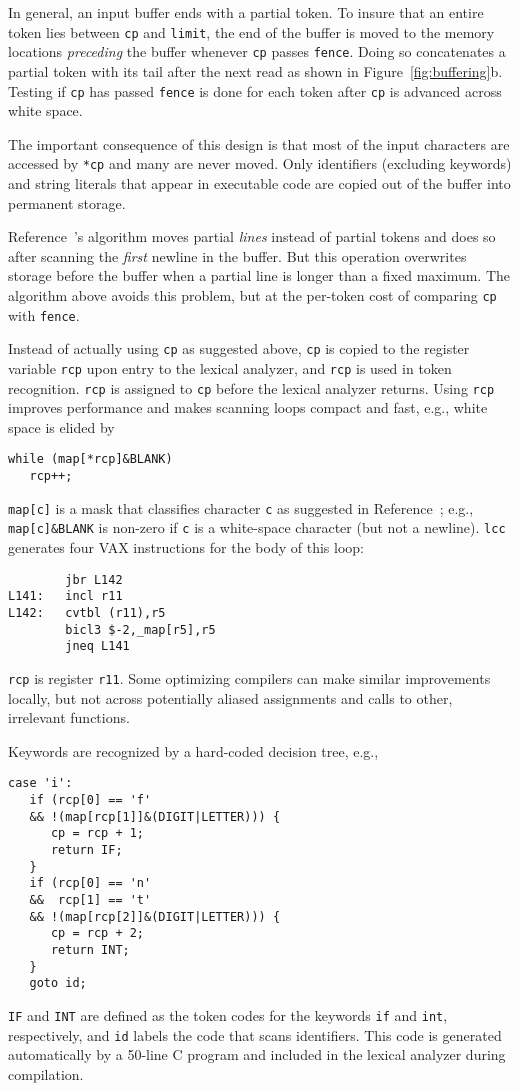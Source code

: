 In general, an input buffer ends with a partial token.
To insure that an entire token lies between
\verb|cp| and \verb|limit|, the end of the buffer is moved to the memory
locations {\em preceding} the buffer whenever
\verb|cp| passes \verb|fence|. Doing so concatenates
a partial token with its tail after the next read
as shown in Figure~\ref{fig:buffering}b.
Testing if \verb|cp| has passed \verb|fence| is done
for each token after \verb|cp| is advanced across white space.

The important consequence of this design is that most
of the input characters are accessed by \verb|*cp|
and many are never moved. Only identifiers (excluding keywords) and string
literals that appear in executable code
are copied out of the buffer into permanent storage.

Reference~\cite{waite86}'s algorithm moves partial {\em lines} instead
of partial tokens and does so after scanning the {\em first} newline in
the buffer.  But this operation overwrites storage before the buffer
when a partial line is longer than a fixed maximum.  The algorithm
above avoids this problem, but at the per-token cost of comparing
\verb|cp| with \verb|fence|.

Instead of actually using \verb|cp| as suggested above,
\verb|cp| is copied to the register variable \verb|rcp|
upon entry to the lexical analyzer, and \verb|rcp| is used in
token recognition. \verb|rcp| is assigned to \verb|cp|
before the lexical analyzer returns.
Using \verb|rcp| improves performance
and makes scanning loops compact and fast, e.g., white space is elided by
\begin{verbatim}
while (map[*rcp]&BLANK)
   rcp++;
\end{verbatim}
\verb|map[c]| is a mask that classifies character \verb|c| as suggested
in Reference~\cite{waite86}; e.g.,
\verb|map[c]&BLANK| is non-zero if \verb|c| is a
white-space character (but not a newline).
\verb|lcc| generates four VAX instructions for the body of this loop:
\begin{verbatim}
        jbr L142
L141:   incl r11
L142:   cvtbl (r11),r5
        bicl3 $-2,_map[r5],r5
        jneq L141
\end{verbatim}
\verb|rcp| is register \verb|r11|.
Some optimizing compilers can make similar improvements locally, but not across
potentially aliased assignments and calls to other, irrelevant functions.

Keywords are recognized by a hard-coded decision tree, e.g.,
\begin{verbatim}
case 'i':
   if (rcp[0] == 'f'
   && !(map[rcp[1]]&(DIGIT|LETTER))) {
      cp = rcp + 1;
      return IF;
   }
   if (rcp[0] == 'n'
   &&  rcp[1] == 't'
   && !(map[rcp[2]]&(DIGIT|LETTER))) {
      cp = rcp + 2;
      return INT;
   }
   goto id;
\end{verbatim}
\verb|IF| and \verb|INT| are defined as the token codes for
the keywords \verb|if| and \verb|int|, respectively, and
\verb|id| labels the code that scans identifiers.
This code is generated automatically by a 50-line C program
and included in the lexical analyzer during compilation.

